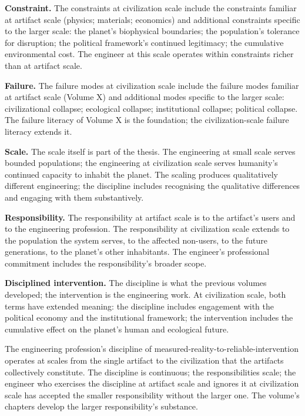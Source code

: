 \textbf{Constraint.} The constraints at civilization scale include the constraints familiar at artifact scale (physics; materials; economics) and additional constraints specific to the larger scale: the planet's biophysical boundaries; the population's tolerance for disruption; the political framework's continued legitimacy; the cumulative environmental cost. The engineer at this scale operates within constraints richer than at artifact scale.

\textbf{Failure.} The failure modes at civilization scale include the failure modes familiar at artifact scale (Volume X) and additional modes specific to the larger scale: civilizational collapse; ecological collapse; institutional collapse; political collapse. The failure literacy of Volume X is the foundation; the civilization-scale failure literacy extends it.

\textbf{Scale.} The scale itself is part of the thesis. The engineering at small scale serves bounded populations; the engineering at civilization scale serves humanity's continued capacity to inhabit the planet. The scaling produces qualitatively different engineering; the discipline includes recognising the qualitative differences and engaging with them substantively.

\textbf{Responsibility.} The responsibility at artifact scale is to the artifact's users and to the engineering profession. The responsibility at civilization scale extends to the population the system serves, to the affected non-users, to the future generations, to the planet's other inhabitants. The engineer's professional commitment includes the responsibility's broader scope.

\textbf{Disciplined intervention.} The discipline is what the previous volumes developed; the intervention is the engineering work. At civilization scale, both terms have extended meaning: the discipline includes engagement with the political economy and the institutional framework; the intervention includes the cumulative effect on the planet's human and ecological future.

\begin{principle}
The engineering profession's discipline of measured-reality-to-reliable-intervention operates at scales from the single artifact to the civilization that the artifacts collectively constitute. The discipline is continuous; the responsibilities scale; the engineer who exercises the discipline at artifact scale and ignores it at civilization scale has accepted the smaller responsibility without the larger one. The volume's chapters develop the larger responsibility's substance.
\end{principle}

